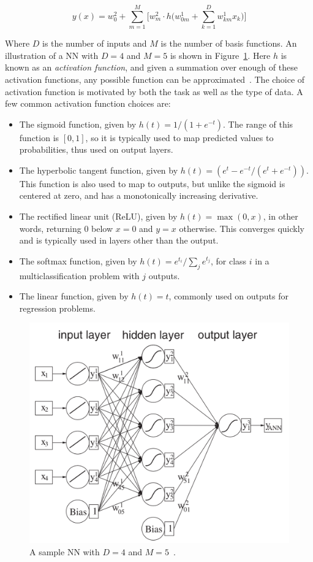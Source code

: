 \begin{equation}
    y(x) = w_0^2 + \sum_{m=1}^{M} \big [w_m^2 \cdot h \big (w_{0m}^1 + \sum_{k=1}^{D} w_{km}^1 x_k) ]
\end{equation}

Where $D$ is the number of inputs and $M$ is the number of basis functions. An illustration of a \gls{NN} with $D=4$ and $M=5$ is shown in Figure~\ref{fig:nn}. Here $h$ is known as an \textit{activation function}, and given a summation over enough of these activation functions, any possible function can be approximated~\cite{nn-basis}. The choice of activation function is motivated by both the task as well as the type of data. A few common activation function choices are:
\begin{itemize}
    \item The sigmoid function, given by $h(t) = 1/(1+e^{-t})$. The range of this function is $[0,1]$, so it is typically used to map predicted values to probabilities, thus used on output layers.
    \item The hyperbolic tangent function, given by $h(t) = (e^t - e^{-t}/(e^t + e^{-t}))$. This function is also used to map to outputs, but unlike the sigmoid is centered at zero, and has a monotonically increasing derivative.
    \item The rectified linear unit (ReLU), given by $h(t)=\max(0,x)$, in other words, returning 0 below $x=0$ and $y=x$ otherwise. This converges quickly and is typically used in layers other than the output.
    \item The softmax function, given by $h(t) = e^{t_i} / \sum\limits_{j} e^{t_j}$, for class $i$ in a multiclassification problem with $j$ outputs.
    \item The linear function, given by $h(t) = t$, commonly used on outputs for regression problems.
\end{itemize}

\begin{figure}[!ht] 
    \centering
    \includegraphics[width=.7\textwidth]{appendices/images/neural_network.png}
    \caption[A sample \gls{NN} with $D=4$ and $M=5$]{A sample \gls{NN} with $D=4$ and $M=5$~\cite{data-analysis}.}
    \label{fig:nn}
\end{figure}

